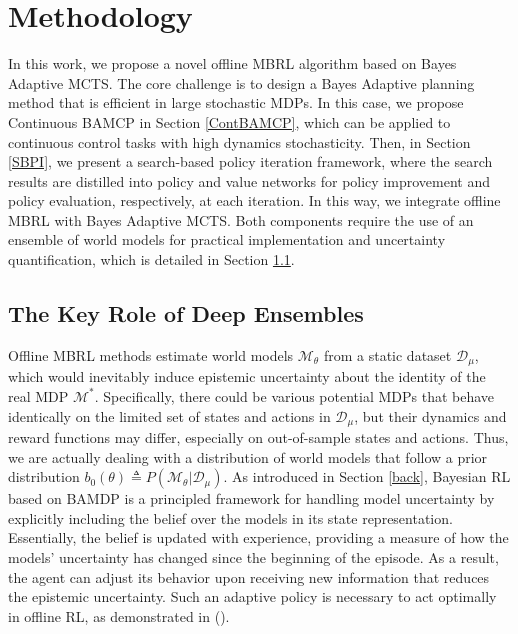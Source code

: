 
\section{Methodology}

In this work, we propose a novel offline MBRL algorithm based on Bayes Adaptive MCTS. The core challenge is to design a Bayes Adaptive planning method that is efficient in large stochastic MDPs. In this case, we propose Continuous BAMCP in Section \ref{ContBAMCP}, which can be applied to continuous control tasks with high dynamics stochasticity. Then, in Section \ref{SBPI}, we present a search-based policy iteration framework, where the search results are distilled into policy and value networks for policy improvement and policy evaluation, respectively, at each iteration. In this way, we integrate offline MBRL with Bayes Adaptive MCTS. Both components require the use of an ensemble of world models for practical implementation and uncertainty quantification, which is detailed in Section \ref{DeepEns}.


\subsection{The Key Role of Deep Ensembles} \label{DeepEns}


Offline MBRL methods estimate world models $\mathcal{M}_\theta$ from a static dataset $\mathcal{D}_\mu$, which would inevitably induce epistemic uncertainty about the identity of the real MDP $\mathcal{M}^*$. Specifically, there could be various potential MDPs that behave identically on the limited set of states and actions in $\mathcal{D}_\mu$, but their dynamics and reward functions may differ, especially on out-of-sample states and actions. Thus, we are actually dealing with a distribution of world models that follow a prior distribution $b_0(\theta) \triangleq P(\mathcal{M}_\theta | \mathcal{D}_\mu)$. As introduced in Section \ref{back}, Bayesian RL based on BAMDP is a principled framework for handling model uncertainty by explicitly including the belief over the models in its state representation.
Essentially, the belief is updated with experience, providing a measure of how the models' uncertainty has changed since the beginning of the episode. As a result, the agent can adjust its behavior upon receiving new information that reduces the epistemic uncertainty. Such an adaptive policy is necessary to act optimally in offline RL, as demonstrated in (\cite{DBLP:conf/icml/GhoshAAL22}).

